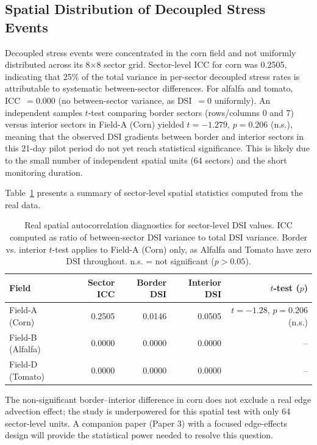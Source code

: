 \documentclass[review,12pt]{elsarticle}
\begin{document}
\subsection{Spatial Distribution of Decoupled Stress Events}
\label{subsec:spatial}

Decoupled stress events were concentrated in the corn field and not uniformly distributed across its 8$\times$8 sector grid. Sector-level ICC for corn was 0.2505, indicating that 25\% of the total variance in per-sector decoupled stress rates is attributable to systematic between-sector differences. For alfalfa and tomato, ICC~$= 0.000$ (no between-sector variance, as DSI~$= 0$ uniformly). An independent samples $t$-test comparing border sectors (rows/columns 0 and 7) versus interior sectors in Field-A (Corn) yielded $t = -1.279$, $p = 0.206$ (n.s.), meaning that the observed DSI gradients between border and interior sectors in this 21-day pilot period do not yet reach statistical significance. This is likely due to the small number of independent spatial units (64 sectors) and the short monitoring duration.

Table~\ref{tab:spatial_stats} presents a summary of sector-level spatial statistics computed from the real data.

\begin{table}[H]
\centering
\caption{Real spatial autocorrelation diagnostics for sector-level DSI values. ICC computed as ratio of between-sector DSI variance to total DSI variance. Border vs. interior $t$-test applies to Field-A (Corn) only, as Alfalfa and Tomato have zero DSI throughout. n.s. = not significant ($p > 0.05$).}
\label{tab:spatial_stats}
\begin{tabular}{lrrrr}
\toprule
\textbf{Field} & \textbf{Sector ICC} & \textbf{Border DSI} & \textbf{Interior DSI} & \textbf{$t$-test ($p$)} \\
\midrule
Field-A (Corn)         & 0.2505 & 0.0146 & 0.0505 & $t=-1.28$, $p=0.206$ (n.s.) \\
Field-B (Alfalfa)      & 0.0000 & 0.0000 & 0.0000 & -- \\
Field-D (Tomato)       & 0.0000 & 0.0000 & 0.0000 & -- \\
\bottomrule
\end{tabular}
\end{table}

The non-significant border--interior difference in corn does not exclude a real edge advection effect; the study is underpowered for this spatial test with only 64 sector-level units. A companion paper (Paper 3) with a focused edge-effects design will provide the statistical power needed to resolve this question.
\end{document}
